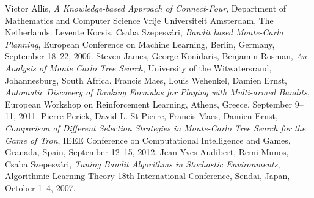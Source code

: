 \documentclass[a4paper,12pt]{article}
\begin{document}
\begin{thebibliography}{20}
	 Victor Allis, \emph{A Knowledge-based Approach of Connect-Four}, Department of Mathematics and Computer Science Vrije Universiteit Amsterdam, The Netherlands. %
	 Levente Kocsis, Csaba Szepesvári, \emph{Bandit based Monte-Carlo Planning}, European Conference on Machine Learning, Berlin, Germany, September 18--22, 2006.
	 Steven James, George Konidaris, Benjamin Rosman, \emph{An Analysis of Monte Carlo Tree Search}, University of the Witwatersrand, Johannesburg, South Africa.
	 Francis Maes, Louis Wehenkel, Damien Ernst, \emph{Automatic Discovery of Ranking Formulas for Playing with Multi-armed Bandits}, European Workshop on Reinforcement Learning, Athens, Greece, September 9--11, 2011.
	 Pierre Perick, David L. St-Pierre, Francis Maes, Damien Ernst, \emph{Comparison of Different Selection Strategies in Monte-Carlo Tree Search for the Game of Tron},  IEEE Conference on Computational Intelligence and Games, Granada, Spain, September 12--15, 2012. %
	 Jean-Yves Audibert, Remi Munos, Csaba Szepesvári, \emph{Tuning Bandit Algorithms in Stochastic Environments}, Algorithmic Learning Theory 18th International Conference, Sendai, Japan, October 1--4, 2007. %
\end{thebibliography}
\end{document}
